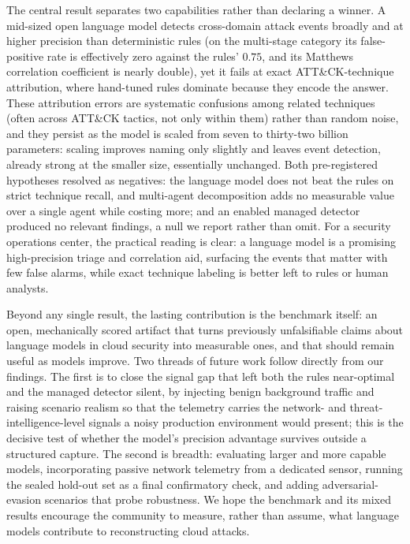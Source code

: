 \documentclass[journal]{IEEEtran}
\begin{document}
The central result separates two capabilities rather than declaring a winner. A mid-sized open language
model detects cross-domain attack events broadly and at higher precision than deterministic rules (on the
multi-stage category its false-positive rate is effectively zero against the rules' $0.75$, and its
Matthews correlation coefficient is nearly double), yet it fails at exact ATT\&CK-technique attribution,
where hand-tuned rules dominate because they encode the answer. These attribution errors are systematic
confusions among related techniques (often across ATT\&CK tactics, not only within them) rather than
random noise, and they persist as the model is scaled
from seven to thirty-two billion parameters: scaling improves naming only slightly and leaves event
detection, already strong at the smaller size, essentially unchanged. Both pre-registered hypotheses
resolved as negatives: the language model does not beat the rules on strict technique recall, and
multi-agent decomposition adds no measurable value over a single agent while costing more; and an
enabled managed detector produced no relevant findings, a null we report rather than omit. For
a security operations center, the practical reading is clear: a language model is a promising
high-precision triage and correlation aid, surfacing the events that matter with few false alarms, while
exact technique labeling is better left to rules or human analysts.

Beyond any single result, the lasting contribution is the benchmark itself: an open, mechanically
scored artifact that turns previously unfalsifiable claims about language models in cloud security into
measurable ones, and that should remain useful as models improve. Two threads of future work follow
directly from our findings. The first is to close the signal gap that left both the rules near-optimal
and the managed detector silent, by injecting benign background traffic and raising scenario realism so
that the telemetry carries the network- and threat-intelligence-level signals a noisy production
environment would present; this is the decisive test of whether the model's precision advantage
survives outside a structured capture. The second is breadth: evaluating larger and more capable models,
incorporating passive network telemetry from a dedicated sensor, running the sealed hold-out set as a
final confirmatory check, and adding adversarial-evasion scenarios that probe robustness. We hope the
benchmark and its mixed results encourage the community to measure, rather than assume, what language
models contribute to reconstructing cloud attacks.
\end{document}
